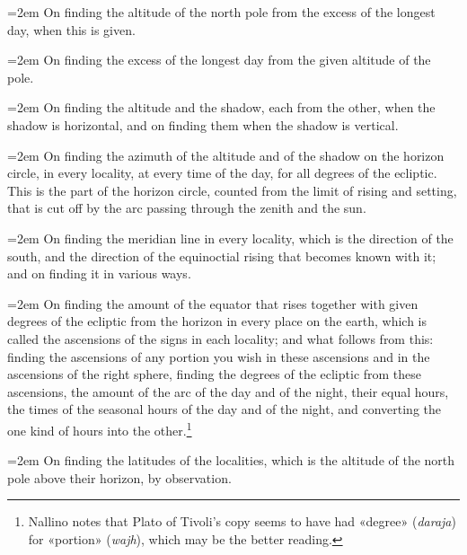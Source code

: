 \documentclass[11pt]{article}
\begin{document}
\par\noindent\hangindent=2em On finding the altitude of the north pole from the excess of the longest day, when this is given.\par
\par\noindent\hangindent=2em On finding the excess of the longest day from the given altitude of the pole.\par
\par\noindent\hangindent=2em On finding the altitude and the shadow, each from the other, when the shadow is horizontal, and on finding them when the shadow is vertical.\par
\par\noindent\hangindent=2em On finding the azimuth of the altitude and of the shadow on the horizon circle, in every locality, at every time of the day, for all degrees of the ecliptic. This is the part of the horizon circle, counted from the limit of rising and setting, that is cut off by the arc passing through the zenith and the sun.\par
\par\noindent\hangindent=2em On finding the meridian line in every locality, which is the direction of the south, and the direction of the equinoctial rising that becomes known with it; and on finding it in various ways.\par
\par\noindent\hangindent=2em On finding the amount of the equator that rises together with given degrees of the ecliptic from the horizon in every place on the earth, which is called the ascensions of the signs in each locality; and what follows from this: finding the ascensions of any portion you wish in these ascensions and in the ascensions of the right sphere, finding the degrees of the ecliptic from these ascensions, the amount of the arc of the day and of the night, their equal hours, the times of the seasonal hours of the day and of the night, and converting the one kind of hours into the other.\footnote{Nallino notes that Plato of Tivoli's copy seems to have had «degree» (\emph{daraja}) for «portion» (\emph{wajh}), which may be the better reading.}\par
\par\noindent\hangindent=2em On finding the latitudes of the localities, which is the altitude of the north pole above their horizon, by observation.\par
\end{document}
